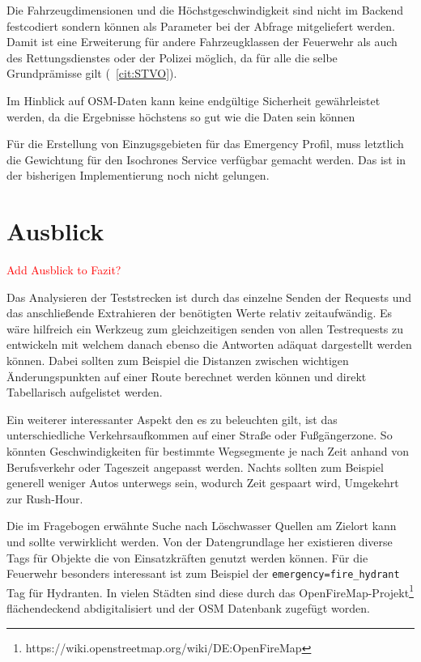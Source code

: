 \documentclass[12pt,a4paper]{article}
\newcommand\todo[1]{\textcolor{red}{#1}}
\begin{document}
Die Fahrzeugdimensionen und die Höchstgeschwindigkeit sind nicht im Backend festcodiert sondern können als Parameter bei der Abfrage mitgeliefert werden. Damit ist eine Erweiterung für andere Fahrzeugklassen der Feuerwehr als auch des Rettungsdienstes oder der Polizei möglich, da für alle die selbe Grundprämisse gilt (~\ref{cit:STVO}).

Im Hinblick auf OSM-Daten kann keine endgültige Sicherheit gewährleistet werden, da die Ergebnisse höchstens so gut wie die Daten sein können

Für die Erstellung von Einzugsgebieten für das Emergency Profil, muss letztlich die Gewichtung für den Isochrones Service verfügbar gemacht werden.
Das ist in der bisherigen Implementierung noch nicht gelungen.

\newpage
\section{Ausblick}

\todo{Add Ausblick to Fazit?}

Das Analysieren der Teststrecken ist durch das einzelne Senden der Requests und das anschließende Extrahieren der benötigten Werte relativ zeitaufwändig. Es wäre hilfreich ein Werkzeug zum gleichzeitigen senden von allen Testrequests zu entwickeln mit welchem danach ebenso die Antworten adäquat dargestellt werden können. Dabei sollten zum Beispiel die Distanzen zwischen wichtigen Änderungspunkten auf einer Route berechnet werden können und direkt Tabellarisch aufgelistet werden.

Ein weiterer interessanter Aspekt den es zu beleuchten gilt, ist das unterschiedliche Verkehrsaufkommen auf einer Straße oder Fußgängerzone. So könnten Geschwindigkeiten für bestimmte Wegsegmente je nach Zeit anhand von Berufsverkehr oder Tageszeit angepasst werden. Nachts sollten zum Beispiel generell weniger Autos unterwegs sein, wodurch Zeit gespaart wird, Umgekehrt zur Rush-Hour.

Die im Fragebogen erwähnte Suche nach Löschwasser Quellen am Zielort kann und sollte verwirklicht werden. Von der Datengrundlage her existieren diverse Tags für Objekte die von Einsatzkräften genutzt werden können. Für die Feuerwehr besonders interessant ist zum Beispiel der \lstinline{emergency=fire_hydrant} Tag für Hydranten. In vielen Städten sind diese durch das OpenFireMap-Projekt\footnote{https://wiki.openstreetmap.org/wiki/DE:OpenFireMap} flächendeckend abdigitalisiert und der OSM Datenbank zugefügt worden.
\end{document}
